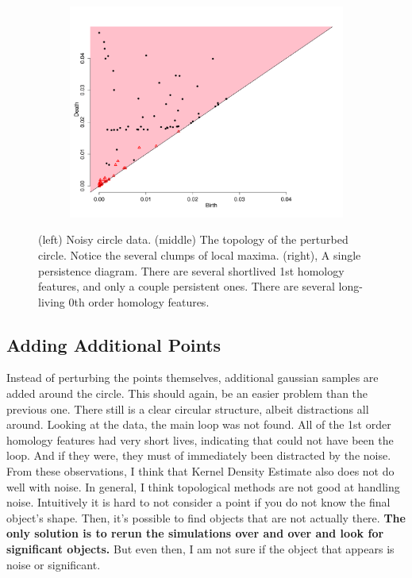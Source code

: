 \documentclass[a4paper]{article}
\begin{document}
\begin{figure}[htp!]
\begin{subfigure}{.32\textwidth}
  \includegraphics[width=\linewidth]{noisycircle3}
\end{subfigure}
\caption{(left) Noisy circle data. (middle) The topology of the perturbed circle. Notice the several clumps of local maxima. (right), A single persistence diagram. There are several shortlived 1st homology features, and only a couple persistent ones. There are several long-living 0th order homology features. }
\end{figure}

\subsection{Adding Additional Points}
Instead of perturbing the points themselves, additional gaussian samples are added around the circle. This should again, be an easier problem than the previous one. There still is a clear circular structure, albeit distractions all around. Looking at the data, the main loop was not found. All of the 1st order homology features had very short lives, indicating that could not have been the loop. And if they were, they must of immediately been distracted by the noise. From these observations, I think that Kernel Density Estimate also does not do well with noise. In general, I think topological methods are not good at handling noise. Intuitively it is hard to not consider a point if you do not know the final object's shape. Then, it's possible to find objects that are not actually there. \textbf{The only solution is to rerun the simulations over and over and look for significant objects.} But even then, I am not sure if the object that appears is noise or significant. 
\end{document}
